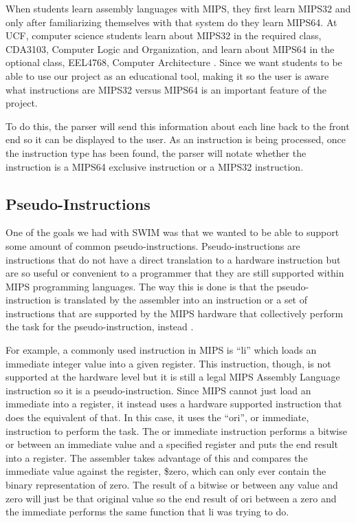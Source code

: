 \documentclass[
    parskip=half,
    fontsize=12pt,
    titlepage=firstiscover,
    toc=bibliography,
    numbers=endperiod
]{scrartcl}
\begin{document}
When students learn assembly languages with MIPS, they first learn
MIPS32 and only after familiarizing themselves with that system do they
learn MIPS64. At UCF, computer science students learn about MIPS32 in
the required class, CDA3103, Computer Logic and Organization, and learn
about MIPS64 in the optional class, EEL4768, Computer Architecture \cite{ucf-cs-electives}.
Since we want students to be able to use our project as an educational
tool, making it so the user is aware what instructions are MIPS32 versus
MIPS64 is an important feature of the project.

To do this, the parser will send this information about each line back
to the front end so it can be displayed to the user. As an instruction
is being processed, once the instruction type has been found, the parser
will notate whether the instruction is a MIPS64 exclusive instruction or
a MIPS32 instruction.

\subsection{Pseudo-Instructions}

One of the goals we had with SWIM was that we wanted to be able to
support some amount of common pseudo-instructions. Pseudo-instructions
are instructions that do not have a direct translation to a hardware
instruction but are so useful or convenient to a programmer that they
are still supported within MIPS programming languages. The way this is
done is that the pseudo-instruction is translated by the assembler into
an instruction or a set of instructions that are supported by the MIPS
hardware that collectively perform the task for the pseudo-instruction,
instead \cite{koehn-pseudoinstructions}.

For example, a commonly used instruction in MIPS is ``li'' which loads
an immediate integer value into a given register. This instruction,
though, is not supported at the hardware level but it is still a legal
MIPS Assembly Language instruction so it is a pseudo-instruction. Since
MIPS cannot just load an immediate into a register, it instead uses a
hardware supported instruction that does the equivalent of that. In this
case, it uses the ``ori'', or immediate, instruction to perform the
task. The or immediate instruction performs a bitwise or between an
immediate value and a specified register and puts the end result into a
register. The assembler takes advantage of this and compares the
immediate value against the register, \$zero, which can only ever
contain the binary representation of zero. The result of a bitwise or
between any value and zero will just be that original value so the end
result of ori between a zero and the immediate performs the same
function that li was trying to do.
\end{document}
